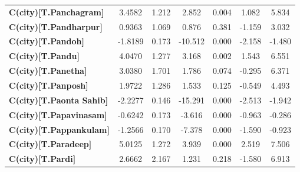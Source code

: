 \begin{center}
\begin{tabular}{lcccccc}
\textbf{C(city)[T.Panchagram]}                                                                      &       3.4582  &        1.212     &     2.852  &         0.004        &        1.082    &        5.834     \\
\textbf{C(city)[T.Pandharpur]}                                                                      &       0.9363  &        1.069     &     0.876  &         0.381        &       -1.159    &        3.032     \\
\textbf{C(city)[T.Pandoh]}                                                                          &      -1.8189  &        0.173     &   -10.512  &         0.000        &       -2.158    &       -1.480     \\
\textbf{C(city)[T.Pandu]}                                                                           &       4.0470  &        1.277     &     3.168  &         0.002        &        1.543    &        6.551     \\
\textbf{C(city)[T.Panetha]}                                                                         &       3.0380  &        1.701     &     1.786  &         0.074        &       -0.295    &        6.371     \\
\textbf{C(city)[T.Panposh]}                                                                         &       1.9722  &        1.286     &     1.533  &         0.125        &       -0.549    &        4.493     \\
\textbf{C(city)[T.Paonta Sahib]}                                                                    &      -2.2277  &        0.146     &   -15.291  &         0.000        &       -2.513    &       -1.942     \\
\textbf{C(city)[T.Papavinasam]}                                                                     &      -0.6242  &        0.173     &    -3.616  &         0.000        &       -0.963    &       -0.286     \\
\textbf{C(city)[T.Pappankulam]}                                                                     &      -1.2566  &        0.170     &    -7.378  &         0.000        &       -1.590    &       -0.923     \\
\textbf{C(city)[T.Paradeep]}                                                                        &       5.0125  &        1.272     &     3.939  &         0.000        &        2.519    &        7.506     \\
\textbf{C(city)[T.Pardi]}                                                                           &       2.6662  &        2.167     &     1.231  &         0.218        &       -1.580    &        6.913     \\

\end{tabular}
\end{center}
